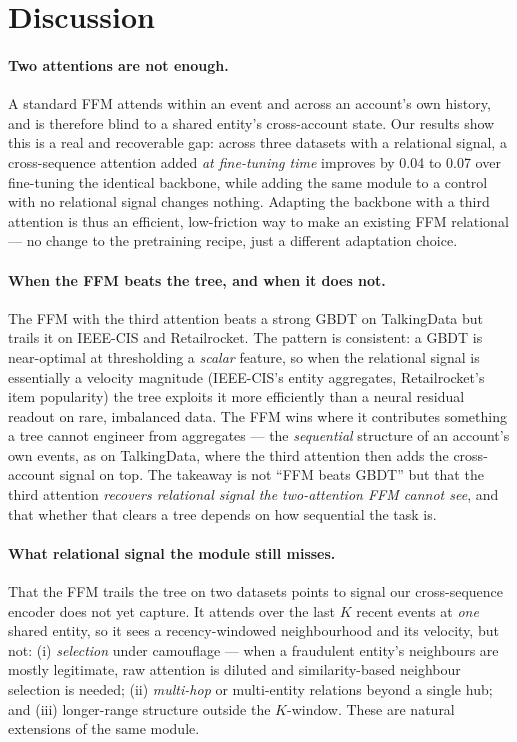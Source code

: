 \section{Discussion}
\label{sec:discussion}

\paragraph{Two attentions are not enough.} A standard FFM attends within an event and across an
account's own history, and is therefore blind to a shared entity's cross-account state. Our results
show this is a real and recoverable gap: across three datasets with a relational signal, a
cross-sequence attention added \emph{at fine-tuning time} improves \prauc{} by \num{+0.04} to
\num{+0.07} over fine-tuning the identical backbone, while adding the same module to a control with no
relational signal changes nothing. Adapting the backbone with a third attention is thus an efficient,
low-friction way to make an existing FFM relational --- no change to the pretraining recipe, just a
different adaptation choice.

\paragraph{When the FFM beats the tree, and when it does not.} The FFM with the third attention beats
a strong GBDT on TalkingData but trails it on IEEE-CIS and Retailrocket. The pattern is consistent: a
GBDT is near-optimal at thresholding a \emph{scalar} feature, so when the relational signal is
essentially a velocity magnitude (IEEE-CIS's entity aggregates, Retailrocket's item popularity) the
tree exploits it more efficiently than a neural residual readout on rare, imbalanced data. The FFM
wins where it contributes something a tree cannot engineer from aggregates --- the \emph{sequential}
structure of an account's own events, as on TalkingData, where the third attention then adds the
cross-account signal on top. The takeaway is not ``FFM beats GBDT'' but that the third attention
\emph{recovers relational signal the two-attention FFM cannot see}, and that whether that clears a
tree depends on how sequential the task is.

\paragraph{What relational signal the module still misses.} That the FFM trails the tree on two
datasets points to signal our cross-sequence encoder does not yet capture. It attends over the last
$K$ recent events at \emph{one} shared entity, so it sees a recency-windowed neighbourhood and its
velocity, but not: (i) \emph{selection} under camouflage --- when a fraudulent entity's neighbours
are mostly legitimate, raw attention is diluted and similarity-based neighbour selection is needed;
(ii) \emph{multi-hop} or multi-entity relations beyond a single hub; and (iii) longer-range
structure outside the $K$-window. These are natural extensions of the same module.

